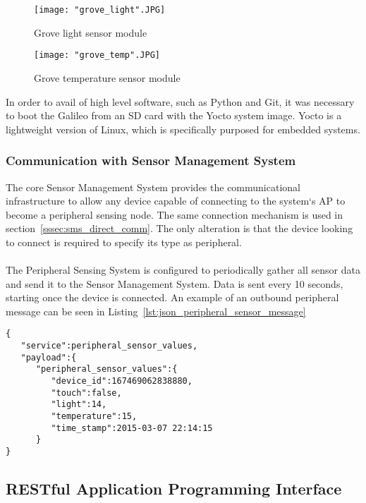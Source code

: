 \documentclass{article}
\begin{document}
\begin{figure}[H]
\centering
\texttt{[image: "grove\_light".JPG]}
\caption{Grove light sensor module}
\label{fig:hard_grove_light}
\end{figure}

\begin{figure}[H]
\centering
\texttt{[image: "grove\_temp".JPG]}
\caption{Grove temperature sensor module}
\label{fig:hard_grove_light}
\end{figure}

In order to avail of high level software, such as Python and Git, it was necessary to boot the Galileo from an SD card with the Yocto system image. Yocto is a lightweight version of Linux, which is specifically purposed for embedded systems. 
\newpage
\subsubsection{Communication with Sensor Management System}
The core Sensor Management System provides the communicational infrastructure to allow any device capable of connecting to the system\lq s AP to become a peripheral sensing node. The same connection mechanism is used in section~\ref{sssec:sms_direct_comm}. The only alteration is that the device looking to connect is required to specify its type as peripheral. \\\\
The Peripheral Sensing System is configured to periodically gather all sensor data and send it to the Sensor Management System. Data is sent every 10 seconds, starting once the device is connected. An example of an outbound peripheral message can be seen in Listing~\ref{lst:json_peripheral_sensor_message}

\begin{lstlisting}[caption={JSON Peripheral Sensor Readings Message Object},label={lst:json_peripheral_sensor_message}]
{  
   "service":peripheral_sensor_values,
   "payload":{  
      "peripheral_sensor_values":{  
      	 "device_id":167469062838880,
         "touch":false,
         "light":14,
         "temperature":15,
         "time_stamp":2015-03-07 22:14:15
      }
}
\end{lstlisting}

\newpage

\subsection{RESTful Application Programming Interface}
\end{document}
